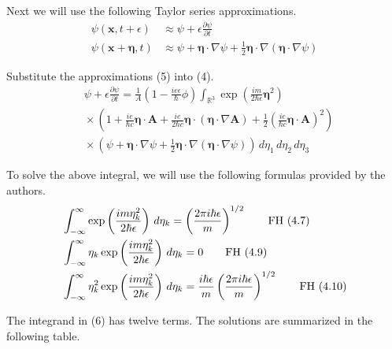 \documentclass[12pt]{article}
\newcommand\INT{\int_{\mathbb R^3}}
\begin{document}
Next we will use the following Taylor series approximations.
\begin{equation*}
\begin{aligned}
\psi(\mathbf x,t+\epsilon)&\approx\psi+\epsilon\frac{\partial\psi}{\partial t}
\\
\psi(\mathbf x+\boldsymbol\eta,t)&\approx\psi+\boldsymbol\eta\cdot\nabla\psi
+\tfrac{1}{2}\boldsymbol\eta\cdot\nabla(\boldsymbol\eta\cdot\nabla\psi)
\end{aligned}
\tag{5}
\end{equation*}

Substitute the approximations (5) into (4).
\begin{align*}
&\psi+\epsilon\frac{\partial\psi}{\partial t}=
\frac{1}{A}
\left(1-\frac{ie\epsilon}{\hbar}\phi\right)
\INT\exp\left(\frac{im}{2\hbar\epsilon}\boldsymbol\eta^2\right)
\\
&{}\times\left(
1
+\frac{ie}{\hbar c}\boldsymbol\eta\cdot\mathbf A
+\frac{ie}{2\hbar c}\boldsymbol\eta\cdot(\boldsymbol\eta\cdot\nabla\mathbf A)
+\frac{1}{2}\left(\frac{ie}{\hbar c}\boldsymbol\eta\cdot\mathbf A\right)^2
\right)
\\
&{}\times\left(
\psi+\boldsymbol\eta\cdot\nabla\psi
+\tfrac{1}{2}\boldsymbol\eta\cdot\nabla(\boldsymbol\eta\cdot\nabla\psi)
\right)
\,d\eta_1\,d\eta_2\,d\eta_3
\tag{6}
\end{align*}

To solve the above integral, we will use the following formulas provided by the authors.
\begin{align*}
&\int_{-\infty}^\infty\exp\left(\frac{im\eta_k^2}{2\hbar\epsilon}\right)\,d\eta_k
=\left(\frac{2\pi i\hbar\epsilon}{m}\right)^{1/2}
\tag*{\text{FH (4.7)}}
\\
&\int_{-\infty}^\infty\eta_k\exp\left(\frac{im\eta_k^2}{2\hbar\epsilon}\right)\,d\eta_k
=0
\tag*{\text{FH (4.9)}}
\\
&\int_{-\infty}^\infty\eta_k^2\exp\left(\frac{im\eta_k^2}{2\hbar\epsilon}\right)\,d\eta_k
=\frac{i\hbar\epsilon}{m}\left(\frac{2\pi i\hbar\epsilon}{m}\right)^{1/2}
\tag*{\text{FH (4.10)}}
\end{align*}

The integrand in (6) has twelve terms.
The solutions are summarized in the following table.
\end{document}
